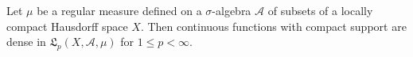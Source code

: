 Let $\mu$ be a regular measure defined on a $\sigma$-algebra $\mathcal{A}$ of subsets of a locally compact Hausdorff space $X$. Then continuous functions with compact support are dense in $\mathfrak{L}_p(X, \mathcal{A}, \mu)$ for $1 \leq p < \infty$.
